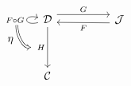 \begin{equation} \label{eq:intrep}
\begin{tikzcd}[column sep=huge,row sep=huge,baseline=(current bounding box.center)]
\mathcal{D}
  \arrow[loop left]{}[name=fg]{F \circ G}
  \rar[start anchor=30, end anchor=151]{G}
  \arrow{d}[swap,name=h]{H} & 
\mathcal{J}\lar[start anchor=196, end anchor=-14]{F} \\
\mathcal{C}
\arrow[shorten >=3pt,Rightarrow,to path={(fg.290) to[out=-90,in=180] node[xshift=-3.5mm] {$\eta$} (h)}]{}
\end{tikzcd}
\end{equation}
